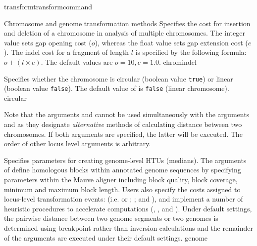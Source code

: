 \begin{command}{transform}{transformcommand}
\begin{arguments}
\begin{argumentgroup}{Chromosome and genome transformation methods}
                {Specifies the cost for insertion and deletion of a chromosome in analysis of
                multiple chromosomes. The integer value sets gap opening
                cost ($o$), whereas the float value sets gap extension
                cost ($e$).  The indel cost for a fragment of length $l$ is
                specified by the following formula:
                    $o + (l \times e)$. The default values are $o=10, e=1.0$.}
                {chromindel}
 
                {Specifies whether the chromosome is circular (boolean value
                \texttt{true}) or linear (boolean value \texttt{false}). The
                default value of  is \texttt{false}
                (linear chromosome).}
                {circular}
             
                \begin{statement}
  		 Note that the arguments  and
                 cannot be used simultaneously
                with the arguments  and
                 as they designate
                \emph{alternative} methods of calculating distance between two
                chromosomes.  If both arguments are specified, the latter will
                be executed. The order of other locus level arguments is
                arbitrary.
	  \end{statement}
		
                {Specifies parameters for creating genome-level HTUs (medians). 
                The arguments of  define 
                homologous blocks within annotated genome sequences by
                specifying parameters within the Mauve aligner \cite{darlingetal2004} 
                including block quality, block coverage, minimum and maximum block
                 length. Users also specify the costs assigned to locus-level transformation 
                 events: (i.e.   or 
                ; ; and 
                 ), and implement a number of heuristic 
                procedures to accelerate computations (, 
                , and ).  
                Under default settings, the pairwise distance between two genome 
                segments or two genomes is determined using breakpoint rather 
                than inversion calculations and the remainder of the arguments are executed 
                under their default settings.}
                {genome}


\end{argumentgroup}
\end{arguments}
\end{command}
